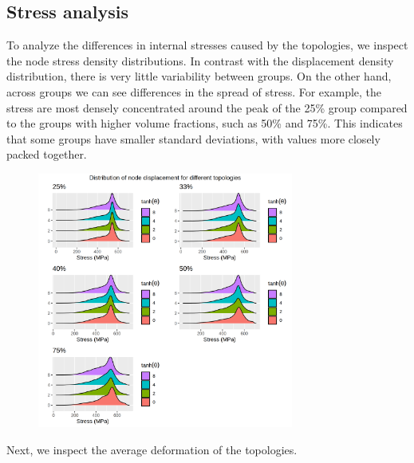 \documentclass[../main.tex]{subfiles}
\begin{document}
\clearpage
\subsection{Stress analysis}

To analyze the differences in internal stresses caused by the topologies, we inspect the node stress density distributions. In contrast with the displacement density distribution, there is very little variability between groups. On the other hand, across groups we can see differences in the spread of stress. For example, the stress are most densely concentrated around the peak of the 25\% group compared to the groups with higher volume fractions, such as 50\% and 75\%. This indicates that some groups have smaller standard deviations, with values more closely packed together. 

\begin{figure}[h!]
  \centering
  \includegraphics[width=0.75\textwidth]{images/results/plots/femoral/stress/stress_density_ridges.png}
\end{figure}

Next, we inspect the average deformation of the topologies. 
\end{document}
